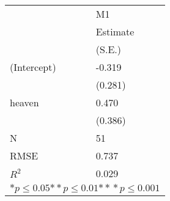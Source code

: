 \begin{tabular}{*{2}{l}}
\hline
                  & M1   \tabularnewline
                   &Estimate \tabularnewline
                 &(S.E.) \tabularnewline
 \hline
 \hline
   (Intercept)     &-0.319 \tabularnewline
                 &(0.281)  \tabularnewline
   heaven          &0.470 \tabularnewline
                 &(0.386)  \tabularnewline
 \hline
 N                 &51       \tabularnewline
 RMSE             &0.737   \tabularnewline
 $R^2$             &0.029   \tabularnewline
 \hline
\hline
 
 \multicolumn{2}{c}{${*  p}\le 0.05$${*\!\!*  p}\le 0.01$${*\!\!*\!\!*  p}\le 0.001$}\tabularnewline
 \end{tabular}